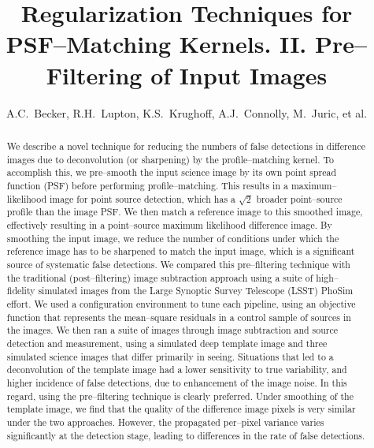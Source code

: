 \documentclass[iop]{emulateapj}
\begin{document}
\title{Regularization Techniques for PSF--Matching Kernels. II. Pre--Filtering of Input Images}

\author{
A.C.~Becker,
R.H.~Lupton,
K.S.~Krughoff,
A.J.~Connolly,
M.~Juric,
et al.
}


\begin{abstract}

We describe a novel technique for reducing the numbers of false detections in difference images due to deconvolution (or sharpening) by the profile--matching kernel.
To accomplish this, we pre--smooth the input science image by its own point spread function (PSF) before performing profile--matching.
This results in a maximum--likelihood image for point source detection, which has a $\sqrt{2}$ broader point--source profile than the image PSF.
We then match a reference image to this smoothed image, effectively resulting in a point--source maximum likelihood difference image.
By smoothing the input image, we reduce the number of conditions under which the reference image has to be sharpened to match the input image, which is a significant source of systematic false detections.
We compared this pre--filtering technique with the traditional (post--filtering) image subtraction approach using a suite of high--fidelity simulated images from the Large Synoptic Survey Telescope (LSST) PhoSim effort.
We used a configuration environment to tune each pipeline, using an objective function that represents the mean--square residuals in a control sample of sources in the images.
We then ran a suite of images through image subtraction and source detection and measurement, using a simulated deep template image and three simulated science images that differ primarily in seeing.
Situations that led to a deconvolution of the template image had a lower sensitivity to true variability, and higher incidence of false detections, due to enhancement of the image noise.
In this regard, using the pre--filtering technique is clearly preferred.
Under smoothing of the template image, we find that the quality of the difference image pixels is very similar under the two approaches.
However, the propagated per--pixel variance varies significantly at the detection stage, leading to differences in the rate of false detections.

\end{abstract}
\end{document}
